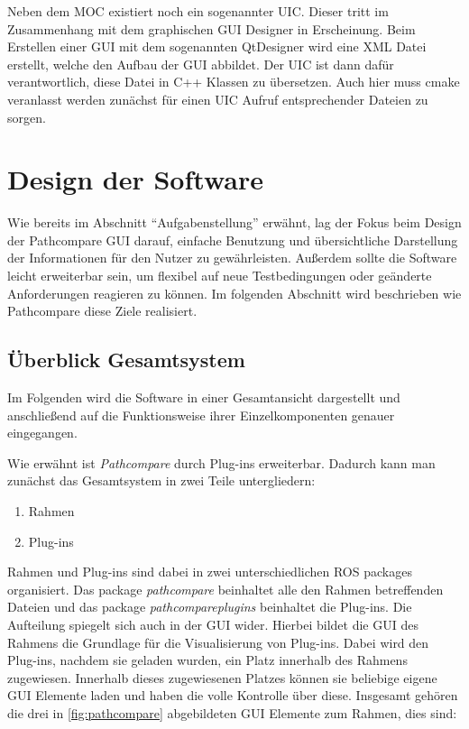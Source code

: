 Neben dem \gls{MOC} existiert noch ein sogenannter \gls{UIC}. Dieser tritt im
Zusammenhang mit dem graphischen GUI Designer in Erscheinung. 
Beim Erstellen einer GUI mit dem sogenannten
QtDesigner wird eine XML Datei erstellt, welche den Aufbau der GUI abbildet.
Der UIC ist dann dafür verantwortlich, diese Datei in C++ Klassen zu übersetzen.
Auch hier muss cmake veranlasst werden zunächst für einen \gls{UIC} Aufruf
entsprechender Dateien zu sorgen.


\section{Design der Software}
Wie bereits im Abschnitt ``Aufgabenstellung'' erwähnt, lag der Fokus beim
Design der Pathcompare GUI darauf, einfache Benutzung und übersichtliche
Darstellung der Informationen für den Nutzer zu gewährleisten.  Außerdem sollte
die Software leicht erweiterbar sein, um flexibel auf neue Testbedingungen oder
geänderte Anforderungen reagieren zu können. Im folgenden Abschnitt wird
beschrieben wie Pathcompare diese Ziele realisiert.

\subsection{Überblick Gesamtsystem}

Im Folgenden wird die Software in einer Gesamtansicht dargestellt und
anschließend auf die Funktionsweise ihrer Einzelkomponenten genauer eingegangen.

Wie erwähnt ist \textit{Pathcompare} durch
Plug-ins erweiterbar. Dadurch kann man zunächst das Gesamtsystem in zwei Teile
untergliedern:

\begin{enumerate}
  \item Rahmen
  \item Plug-ins
\end{enumerate}

Rahmen und Plug-ins sind dabei in zwei unterschiedlichen ROS packages
organisiert. Das package \textit{pathcompare} beinhaltet alle den Rahmen betreffenden
Dateien und das package \textit{pathcompareplugins} beinhaltet die Plug-ins.
Die Aufteilung spiegelt sich auch in der GUI wider.
Hierbei bildet die GUI des Rahmens die Grundlage für die Visualisierung von Plug-ins.
Dabei wird den Plug-ins, nachdem sie geladen wurden, ein Platz innerhalb des
Rahmens zugewiesen. Innerhalb dieses zugewiesenen Platzes können sie beliebige
eigene GUI Elemente laden und haben die volle Kontrolle über diese. Insgesamt
gehören die drei in \autoref{fig:pathcompare} abgebildeten GUI Elemente zum
Rahmen, dies sind:

